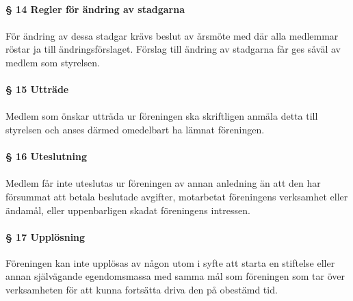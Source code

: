 \documentclass[12pt, a4paper]{article}
\begin{document}
\paragraph{§ 14 Regler för ändring av stadgarna}
\paragraph{}
För ändring av dessa stadgar krävs beslut av årsmöte med där alla medlemmar röstar ja till ändringsförslaget. Förslag till
ändring av stadgarna får ges såväl av medlem som styrelsen.

\paragraph{§ 15 Utträde}
\paragraph{}
Medlem som önskar utträda ur föreningen ska skriftligen anmäla detta till styrelsen och anses därmed omedelbart ha lämnat föreningen.

\paragraph{§ 16 Uteslutning}
\paragraph{}
Medlem får inte uteslutas ur föreningen av annan anledning än att den har försummat att betala beslutade avgifter, motarbetat föreningens
verksamhet eller ändamål, eller uppenbarligen skadat föreningens intressen.

\paragraph{§ 17 Upplösning}
Föreningen kan inte upplösas av någon utom i syfte att starta en stiftelse eller annan självägande egendomsmassa med samma mål som föreningen som
tar över verksamheten för att kunna fortsätta driva den på obestämd tid.
\end{document}

